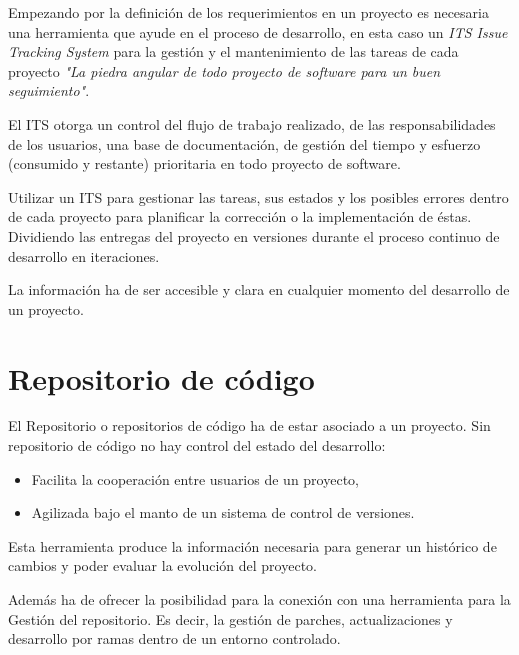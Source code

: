 \par Empezando por la definición de los requerimientos en un proyecto es necesaria una herramienta que ayude en el proceso de desarrollo, en esta caso un \emph{ITS Issue Tracking System} para la gestión y el mantenimiento de las tareas de cada proyecto \emph{"La piedra angular de todo proyecto de software para un buen seguimiento"}.

\par El ITS otorga un control del flujo de trabajo realizado, de las responsabilidades de los usuarios, una base de documentación, de gestión del tiempo y esfuerzo (consumido y restante) prioritaria en todo proyecto de software.

\par Utilizar un ITS para gestionar las tareas, sus estados y los posibles errores dentro de cada proyecto para planificar la corrección o la implementación de éstas. Dividiendo las entregas del proyecto en versiones durante el proceso continuo de desarrollo en iteraciones.

\par La información ha de ser accesible y clara en cualquier momento del desarrollo de un proyecto.


\section{Repositorio de código}
\label{sec:repositorio-codigo}

\par El Repositorio o repositorios de c\'odigo ha de estar asociado a un proyecto. Sin repositorio de código no hay control del estado del desarrollo:

\begin{itemize}
	\item Facilita la cooperación entre usuarios de un proyecto,
	\item Agilizada bajo el manto de un sistema de control de versiones.
\end{itemize}

\par Esta herramienta produce la información necesaria para generar un histórico de cambios y poder evaluar la evolución del proyecto.

\par Además ha de ofrecer la posibilidad para la conexión con una herramienta para la Gesti\'on del repositorio. Es decir, la gestión de parches, actualizaciones y desarrollo por ramas dentro de un entorno controlado.

